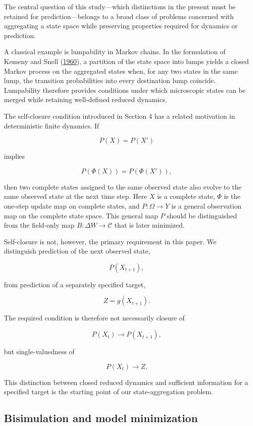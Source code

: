 \documentclass[
  11pt,
]{article}
\begin{document}
The central question of this study---which distinctions in the present
must be retained for prediction---belongs to a broad class of problems
concerned with aggregating a state space while preserving properties
required for dynamics or prediction.

A classical example is lumpability in Markov chains. In the formulation
of Kemeny and Snell (\protect\hyperlink{ref-kemeny1960}{1960}), a
partition of the state space into lumps yields a closed Markov process
on the aggregated states when, for any two states in the same lump, the
transition probabilities into every destination lump coincide.
Lumpability therefore provides conditions under which microscopic states
can be merged while retaining well-defined reduced dynamics.

The self-closure condition introduced in Section 4 has a related
motivation in deterministic finite dynamics. If

\[{P(X)=P(X')}\]

implies

\[{P(\Phi(X))=P(\Phi(X')),}\]

then two complete states assigned to the same observed state also evolve
to the same observed state at the next time step. Here \({X}\) is a
complete state, \({\Phi}\) is the one-step update map on complete
states, and \({P:\Omega\to Y}\) is a general observation map on the
complete state space. This general map \({P}\) should be distinguished
from the field-only map \({B:\Delta W\to\mathcal C}\) that is later
minimized.

Self-closure is not, however, the primary requirement in this paper. We
distinguish prediction of the next observed state,

\[{P(X_{t+1}),}\]

from prediction of a separately specified target,

\[{Z=g(X_{t+1}).}\]

The required condition is therefore not necessarily closure of

\[{P(X_t)\longrightarrow P(X_{t+1}),}\]

but single-valuedness of

\[{P(X_t)\longrightarrow Z.}\]

This distinction between closed reduced dynamics and sufficient
information for a specified target is the starting point of our
state-aggregation problem.

\hypertarget{bisimulation-and-model-minimization}{%
\subsection{Bisimulation and model
minimization}\label{bisimulation-and-model-minimization}}
\end{document}

